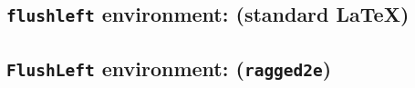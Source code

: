 \documentclass{article}
\begin{document}
	\setlength{\hsize}{0.9\hsize}%
	
	\subsection*{\texttt{flushleft} environment: (standard \LaTeX{})}
	
	\begin{flushleft}
		\blindtext[1]
	\end{flushleft}
	
	\subsection*{\texttt{FlushLeft} environment: (\texttt{ragged2e})}
	
	\begin{FlushLeft}
		\blindtext[1]
	\end{FlushLeft}
	
\end{document}
